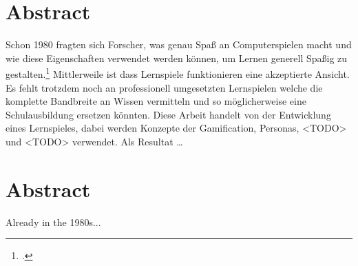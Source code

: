 \section*{Abstract}
Schon 1980 fragten sich Forscher, was genau Spaß an Computerspielen macht und wie diese Eigenschaften verwendet werden können, um Lernen generell Spaßig zu gestalten.\footcite{learn-game-history} Mittlerweile ist dass Lernspiele funktionieren eine akzeptierte Ansicht. Es fehlt trotzdem noch an professionell umgesetzten Lernspielen welche die komplette Bandbreite an Wissen vermitteln und so möglicherweise eine Schulausbildung ersetzen könnten.
Diese Arbeit handelt von der Entwicklung eines Lernspieles, dabei werden Konzepte der Gamification, Personas, <TODO> und <TODO> verwendet.
Als Resultat \dots

\vfill

\section*{Abstract}
Already in the 1980s...

\vfill\newpage
